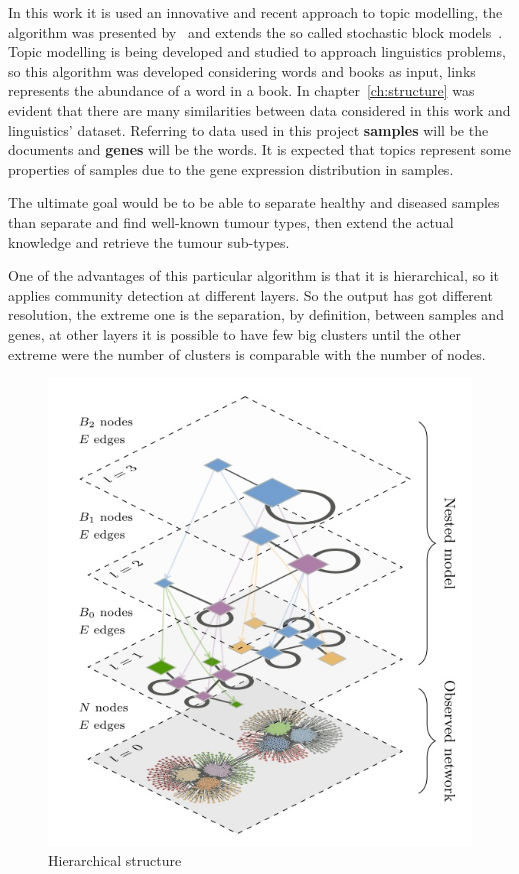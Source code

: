 In this work it is used an innovative and recent approach to topic modelling, the algorithm was presented by~\cite{gerlach2018network} and extends the so called stochastic block models~\cite{Holland1983}. 
Topic modelling is being developed and studied to approach linguistics problems, so this algorithm was developed considering words and books as input, links represents the abundance of a word in a book. In chapter~\ref{ch:structure} was evident that there are many similarities between data considered in this work and linguistics' dataset. Referring to data used in this project \textbf{samples} will be the documents and \textbf{genes} will be the words.
It is expected that topics represent some properties of samples due to the gene expression distribution in samples.

The ultimate goal would be to be able to separate healthy and diseased samples than separate and find well-known tumour types, then extend the actual knowledge and retrieve the tumour sub-types.

One of the advantages of this particular algorithm is that it is hierarchical, so it applies community detection at different layers. So the output has got different resolution, the extreme one is the separation, by definition, between samples and genes, at other layers it is possible to have few big clusters until the other extreme were the number of clusters is comparable with the number of nodes.
\begin{figure}[htb!]
  \centering
  \includegraphics[width=0.6\linewidth]{pictures/topic/peixioto_hierarchic.jpg}
  \caption{Hierarchical structure}
  \label{fig:topic_peixioto_hierarchic}
\end{figure}

